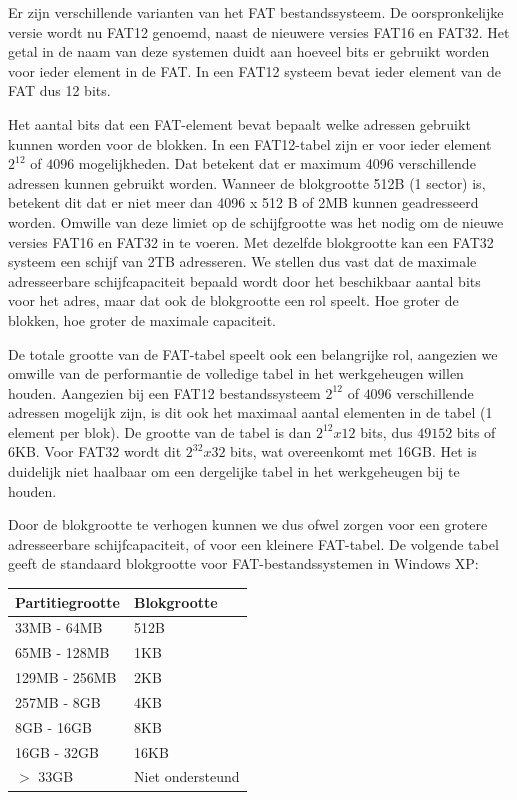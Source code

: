 Er zijn verschillende varianten van het FAT bestandssysteem. De
oorspronkelijke versie wordt nu FAT12 genoemd, naast de nieuwere
versies FAT16 en FAT32. Het getal in de naam van deze systemen duidt
aan hoeveel bits er gebruikt worden voor ieder element in de FAT. In
een FAT12 systeem bevat ieder element van de FAT dus 12 bits.

Het aantal bits dat een FAT-element bevat bepaalt welke adressen
gebruikt kunnen worden voor de blokken. In een FAT12-tabel zijn er
voor ieder element $2^{12}$ of $4096$
mogelijkheden. Dat betekent dat er maximum 4096 verschillende adressen
kunnen gebruikt worden. Wanneer de blokgrootte 512B (1 sector) is,
betekent dit dat er niet meer dan 4096 x 512 B of 2MB kunnen
geadresseerd worden. Omwille van deze limiet op de schijfgrootte was
het nodig om de nieuwe versies FAT16 en FAT32 in te voeren. Met
dezelfde blokgrootte kan een FAT32 systeem een schijf van 2TB
adresseren. We stellen dus vast dat de maximale adresseerbare
schijfcapaciteit bepaald wordt door het beschikbaar aantal bits voor
het adres, maar dat ook de blokgrootte een rol speelt. Hoe groter de
blokken, hoe groter de maximale capaciteit.

De totale grootte van de FAT-tabel speelt ook een belangrijke
rol, aangezien we omwille van de performantie de volledige tabel in
het werkgeheugen willen houden. Aangezien bij een FAT12
bestandssysteem $2^{12}$ of $4096$ verschillende
adressen mogelijk zijn, is dit ook het maximaal aantal elementen in de
tabel (1 element per blok). De grootte van de tabel is dan
$2^{12}x12$ bits, dus $49152$ bits of 6KB. Voor
FAT32 wordt dit $2^{32}x32$ bits, wat
overeenkomt met 16GB. Het is duidelijk niet haalbaar om een
dergelijke tabel in het werkgeheugen bij te houden.

Door de blokgrootte te verhogen kunnen we dus ofwel zorgen voor
een grotere adresseerbare schijfcapaciteit, of voor een kleinere
FAT-tabel. De volgende tabel geeft de standaard blokgrootte voor
FAT-bestandssystemen in Windows XP:

\begin{center}
\begin{tabular}{|l|l|}
\hline
Partitiegrootte  & Blokgrootte \\
\hline
33MB - 64MB      & 512B \\
65MB - 128MB     & 1KB \\
129MB - 256MB    & 2KB \\
257MB - 8GB      & 4KB \\
8GB - 16GB       & 8KB \\
16GB - 32GB      & 16KB \\
$>$ 33GB         & Niet ondersteund\\
\hline
\end{tabular}
\end{center}


